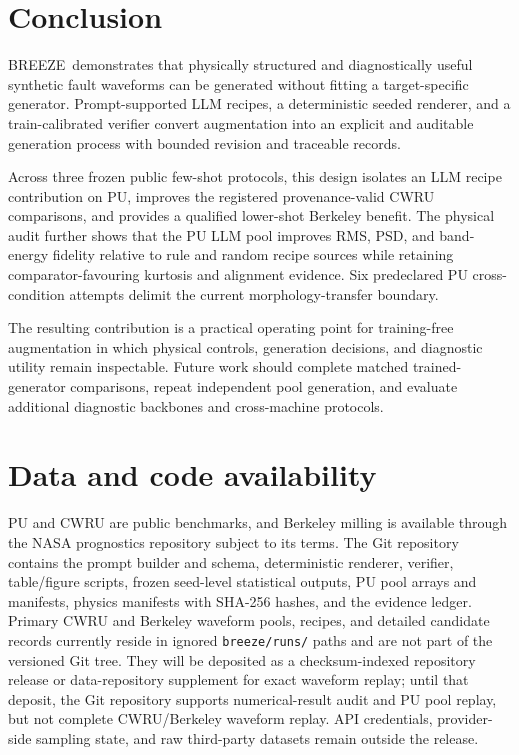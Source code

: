 \documentclass[a4paper,fleqn]{cas-sc}
\newcommand{\breeze}{BREEZE}
\begin{document}
\section{Conclusion}
\label{sec:conclusion}

\breeze\ demonstrates that physically structured and diagnostically useful
synthetic fault waveforms can be generated without fitting a target-specific
generator. Prompt-supported LLM recipes, a deterministic seeded renderer, and
a train-calibrated verifier convert augmentation into an explicit and auditable
generation process with bounded revision and traceable records.

Across three frozen public few-shot protocols, this design isolates an LLM
recipe contribution on PU, improves the registered provenance-valid CWRU
comparisons, and provides a qualified lower-shot Berkeley benefit. The physical
audit further shows that the PU LLM pool improves RMS, PSD, and band-energy
fidelity relative to rule and random recipe sources while retaining
comparator-favouring kurtosis and alignment evidence. Six predeclared PU
cross-condition attempts delimit the current morphology-transfer boundary.

The resulting contribution is a practical operating point for training-free
augmentation in which physical controls, generation decisions, and diagnostic
utility remain inspectable. Future work should complete matched trained-
generator comparisons, repeat independent pool generation, and evaluate
additional diagnostic backbones and cross-machine protocols.

\section*{Data and code availability}

PU and CWRU are public benchmarks, and Berkeley milling is available through
the NASA prognostics repository subject to its terms. The Git repository
contains the prompt builder and schema, deterministic renderer, verifier,
table/figure scripts, frozen seed-level statistical outputs, PU pool arrays and
manifests, physics manifests with SHA-256 hashes, and the evidence ledger.
Primary CWRU and Berkeley waveform pools, recipes, and detailed candidate
records currently reside in ignored \texttt{breeze/runs/} paths and are not
part of the versioned Git tree. They will be deposited as a checksum-indexed
repository release or data-repository supplement for exact waveform replay;
until that deposit, the Git repository supports numerical-result audit and PU
pool replay, but not complete CWRU/Berkeley waveform replay. API credentials,
provider-side sampling state, and raw third-party datasets remain outside the
release.
\end{document}
